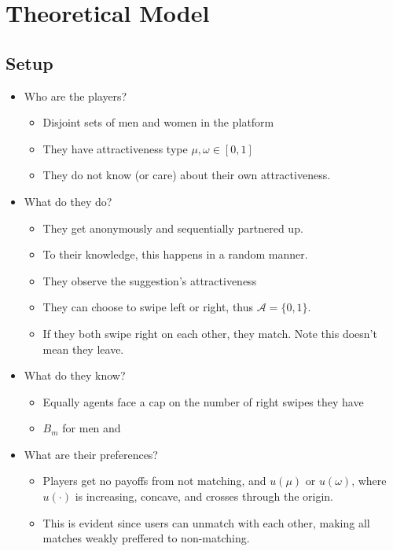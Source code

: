 \section{Theoretical Model}
\label{sec: figs tables algos}
\subsection{Setup} 
\begin{itemize}
    \item Who are the players?
    \begin{itemize}
        \item Disjoint sets of men and women in the platform
        \item They have attractiveness type $\mu,\omega \in [0,1]$
        \item They do not know (or care) about their own attractiveness.
    \end{itemize} 
    \item What do they do?
    \begin{itemize}
        \item They get anonymously and sequentially partnered up.
        \item To their knowledge, this happens in a random manner.
        \item They observe the suggestion's attractiveness 
        \item They can choose to swipe left or right, thus $\mathcal{A}=\{0,1\}$.
        \item If they both swipe right on each other, they match. Note this doesn't mean they leave.
    \end{itemize}
    \item What do they know?
    \begin{itemize}
        
        \item Equally agents face a cap on the number of right swipes they have
        \item $B_m$ for men and 
    \end{itemize}
    \item What are their preferences?
    \begin{itemize}
        \item Players get no payoffs from not matching, and $u(\mu)$ or $u(\omega)$, where $u(\cdot)$ is increasing, concave, and crosses through the origin.
        \item This is evident since users can unmatch with each other, making all matches weakly preffered to non-matching.  
    \end{itemize}
\end{itemize}
